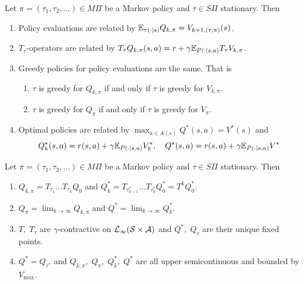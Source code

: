 \begin{prop}
  Let $\pi = (\tau_1, \tau_2, \dots) \in M\Pi$ be a Markov policy
  and $\tau \in S\Pi$ stationary. Then
  \leavevmode
  \begin{enumerate}
    \item Policy evaluations are related by
      $\mathbb{E}_{\tau(\cdot \mid s)} Q_{k, \pi} = V_{k+1, (\tau, \pi)}(s)$.
    \item $T_\tau$-operators are related by $T_\tau Q_{k, \pi}(s, a)
      = r + \gamma \mathbb{E}_{P(\cdot \mid s, a)} T_\tau V_{k, \pi}$.
    \item Greedy policies for policy evaluations are the same.
      That is
      \begin{enumerate}
	\item $\tau$ is greedy for
	  $Q_{k, \pi}$ if and only if $\tau$ is greedy for $V_{k, \pi}$.
	\item $\tau$ is greedy for $Q_\pi$ if and only if $\tau$ is greedy for
	  $V_\pi$.
      \end{enumerate}
    \item Optimal policies are related by
      $\max_{a \in A(s)} Q^*(s, a) = V^*(s)$ and
      \[ Q^*_k(s, a) = r(s, a) + \gamma \mathbb{E}_{P(\cdot \mid s, a)} V^*_k,
      \quad Q^*(s, a) = r(s, a) + \gamma \mathbb{E}_{P(\cdot \mid s, a)} V^* \]
    \end{enumerate}
  \label{prop:relQV}
\end{prop}

\begin{prop}
  Let $\pi = (\tau_1, \tau_2, \dots) \in M\Pi$ be a Markov policy
  and $\tau \in S\Pi$ stationary. Then
  \leavevmode
  \begin{enumerate}
    \item $Q_{k, \pi} = T_{\tau_1} \dots T_{\tau_k} Q_0$ and
      $Q^*_k = T_{\tau_{k-1}^*} \dots T_{\tau_0^*} Q^*_0
      = T^k Q^*_0$.
    \item $Q_\pi = \lim_{k \to \infty} Q_{k, \pi}$ and
      $Q^* = \lim_{k\to\infty} Q_k^*$. 
    \item $T,\; T_\tau$ are $\gamma$-contractive on
      $\mathcal{L}_\infty(\mathcal{S}\times\mathcal{A})$
      and $Q^*,\; Q_\tau$ are their unique fixed points.
    \item $Q^* = Q_{\tau^*}$ and
      $Q_{k, \pi},\; Q_\pi,\; Q^*_k,\; Q^*$ are all upper semicontinuous
      and bounded by $V_{\max}$.
  \end{enumerate}
  \label{prop:propQ}
\end{prop}

